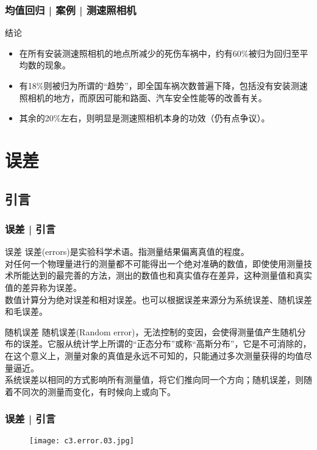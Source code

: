 \begin{frame}
  \frametitle{均值回归 | 案例 | 测速照相机}
  \begin{block}{结论}
    \begin{itemize}
      \item 在所有安装测速照相机的地点所减少的死伤车祸中，约有60\%被归为回归至平均数的现象。
      \item 有18\%则被归为所谓的“趋势”，即全国车祸次数普遍下降，包括没有安装测速照相机的地方，而原因可能和路面、汽车安全性能等的改善有关。
      \item 其余的20\%左右，则明显是测速照相机本身的功效（仍有点争议）。
    \end{itemize}
  \end{block}
\end{frame}

\section{误差}
\subsection{引言}
\begin{frame}
  \frametitle{误差 | 引言}
  \begin{block}{误差}
    误差(errors)是实验科学术语。指测量结果偏离真值的程度。\\
    \vspace{0.3em}
对任何一个物理量进行的测量都不可能得出一个绝对准确的数值，即使使用测量技术所能达到的最完善的方法，测出的数值也和真实值存在差异，这种测量值和真实值的差异称为误差。\\
\vspace{0.3em}
数值计算分为绝对误差和相对误差。也可以根据误差来源分为系统误差、随机误差和毛误差。
  \end{block}
  \pause
  \begin{block}{随机误差}
    随机误差(Random error)，无法控制的变因，会使得测量值产生随机分布的误差。它服从统计学上所谓的“正态分布”或称“高斯分布”，它是不可消除的，在这个意义上，测量对象的真值是永远不可知的，只能通过多次测量获得的均值尽量逼近。\\
    \vspace{0.3em}
    系统误差以相同的方式影响所有测量值，将它们推向同一个方向；随机误差，则随着不同次的测量而变化，有时候向上或向下。
  \end{block}
\end{frame}

\begin{frame}
  \frametitle{误差 | 引言}
  \begin{figure}
    \centering
    \texttt{[image: c3.error.03.jpg]}
  \end{figure}
\end{frame}


